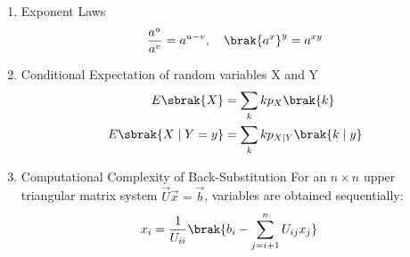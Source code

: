 \begin{enumerate}[label=\thesubsection.\arabic*, ref=\thesubsection.\theenumi]
	\item Exponent Laws
	\begin{align}
		\frac{a^{u}}{a^{v}} = a^{u-v}, \quad \brak{a^x}^y = a^{xy} \label{eq:DA2025-exponent}
	\end{align}
	\item Conditional Expectation of random variables X and Y
	\begin{align}
		E\sbrak{X} &= \sum_{k} k p_X\brak{k} \label{eq:DA2025-expectation}
		\\
		E\sbrak{X \mid Y = y} &= \sum_{k} k p_{X|Y}\brak{k \mid y} \label{eq:DA2025-cond_expectation}
	\end{align}
	\item Computational Complexity of Back-Substitution
	For an $n \times n$ upper triangular matrix system $\vec{U}\vec{x} = \vec{b}$, variables are obtained sequentially:
	\begin{align}
		x_i &= \frac{1}{U_{ii}}\brak{b_i - \sum_{j=i+1}^n U_{ij} x_j} \label{eq:DA2025-back_sub}
	\end{align}
	

\end{enumerate}
